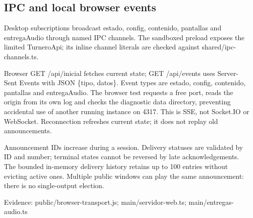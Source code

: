 \subsection{IPC and local browser events}

Desktop subscriptions broadcast estado, config, contenido, pantallas and entregaAudio through named IPC channels. The sandboxed preload exposes the limited TurneroApi; its inline channel literals are checked against shared/ipc-channels.ts.

Browser GET /api/inicial fetches current state; GET /api/events uses Server-Sent Events with JSON \{tipo, datos\}. Event types are estado, config, contenido, pantallas and entregaAudio. The browser test requests a free port, reads the origin from its own log and checks the diagnostic data directory, preventing accidental use of another running instance on 4317. This is SSE, not Socket.IO or WebSocket. Reconnection refreshes current state; it does not replay old announcements.

Announcement IDs increase during a session. Delivery statuses are validated by ID and number; terminal states cannot be reversed by late acknowledgements. The bounded in-memory delivery history retains up to 100 entries without evicting active ones. Multiple public windows can play the same announcement: there is no single-output election.

Evidence: public/browser-transport.js; main/servidor-web.ts; main/entregas-audio.ts
